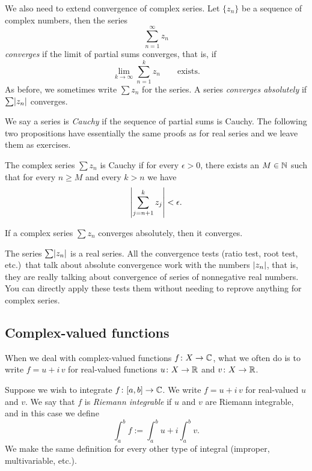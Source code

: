 We also need to extend convergence of complex series.  Let $\{ z_n \}$ be a
sequence of complex
numbers, then the series
\begin{equation*}
\sum_{n=1}^\infty z_n
\end{equation*}
\emph{converges} if the limit of partial sums converges, that is, if
\begin{equation*}
\lim_{k\to\infty} \sum_{n=1}^k z_n \qquad \text{exists.}
\end{equation*}
As before, we sometimes write $\sum z_n$ for the series.
A series \emph{converges absolutely} if $\sum \lvert {z_n} \rvert$ converges.

We say a series
is \emph{Cauchy}
if the sequence of partial sums is Cauchy.  The following two
propositions have essentially the same proofs as for real series and we
leave them as exercises.

\begin{prop} \label{prop:cachysercomplex}
The complex series $\sum z_n$ is Cauchy if for every $\epsilon > 0$, 
there exists an $M \in {\mathbb{N}}$ such that for every $n \geq M$
and every $k > n$ we have
\begin{equation*}
\left\lvert { \sum_{j={n+1}}^k z_j } \right\rvert
< \epsilon .
\end{equation*}
\end{prop}

\begin{prop} \label{prop:absconvmeansconv}
If a complex series $\sum z_n$ converges absolutely, then it converges.
\end{prop}

The series $\sum \lvert {z_n} \rvert$ is a real series.  All the
convergence tests (ratio test, root test, etc.)\ that talk about
absolute convergence work with the numbers $\lvert {z_n} \rvert$, that is, they
are really talking about convergence of series of nonnegative real
numbers.
You
can directly apply these tests
them without needing to reprove anything for complex
series.

\subsection{Complex-valued functions}

When we deal with complex-valued functions
$f \colon X \to {\mathbb{C}}$, what we often do is to write
$f = u+i\,v$ for real-valued functions $u \colon X \to {\mathbb{R}}$ and $v \colon X \to
{\mathbb{R}}$.

Suppose we wish to integrate
$f \colon [a,b] \to {\mathbb{C}}$.  We write
$f = u+i\,v$ for real-valued $u$ and $v$.
We say that $f$ is \emph{Riemann integrable}
if $u$ and $v$ are Riemann
integrable, and in this case we define
\begin{equation*}
\int_a^b f := \int_a^b u + i \int_a^b v .
\end{equation*}
We make the same definition for every other type of integral (improper,
multivariable, etc.).

